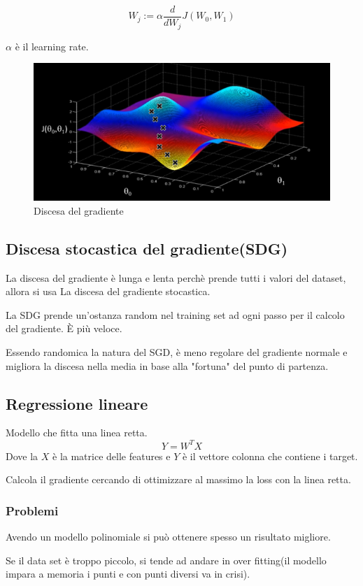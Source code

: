 \begin{equation}
    W_j := \alpha\frac{d}{dW_j}J(W_0,W_1)
\end{equation}

$\alpha$ è il learning rate.

\begin{figure}[H]
    \centering
    \includegraphics[width=0.5\linewidth]{imgs/discesa-gradiente}
    \caption{Discesa del gradiente}
    \label{fig:discesa_gradiente}
\end{figure}

\subsection{Discesa stocastica del gradiente(SDG)}
La discesa del gradiente è lunga e lenta perchè prende tutti i valori del
dataset, allora si usa La discesa del gradiente stocastica.

La SDG prende un'ostanza random nel training set ad ogni passo
per il calcolo del gradiente.
È più veloce.

Essendo randomica la natura del SGD, è meno regolare del gradiente normale
e migliora la discesa nella media in base alla "fortuna" del punto di
partenza.

\subsection{Regressione lineare}
Modello che fitta una linea retta.
\begin{equation}
    Y=W^{T}X
\end{equation}
Dove la $X$ è la matrice delle features e $Y$ è il vettore colonna che
contiene i target.

Calcola il gradiente cercando di ottimizzare al massimo la loss con
la linea retta.

\subsubsection{Problemi}
Avendo un modello polinomiale si può ottenere spesso un risultato migliore.

Se il data set è troppo piccolo, si tende ad andare in over fitting(il modello impara a
memoria i punti e con punti diversi va in crisi).



